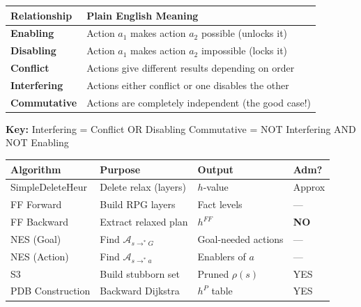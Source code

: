 \documentclass[11pt,a4paper]{article}
\begin{document}
\begin{warningbox}
\begin{center}
\begin{tabular}{@{}lp{10cm}@{}}
\toprule
\textbf{Relationship} & \textbf{Plain English Meaning} \\
\midrule
\textbf{Enabling} & Action $a_1$ makes action $a_2$ possible (unlocks it) \\
\textbf{Disabling} & Action $a_1$ makes action $a_2$ impossible (locks it) \\
\textbf{Conflict} & Actions give different results depending on order \\
\textbf{Interfering} & Actions either conflict or one disables the other \\
\textbf{Commutative} & Actions are completely independent (the good case!) \\
\bottomrule
\end{tabular}
\end{center}

\textbf{Key:} Interfering = Conflict OR Disabling \quad Commutative = NOT Interfering AND NOT Enabling
\end{warningbox}

\begin{examplebox}
\begin{center}
\begin{tabular}{@{}llll@{}}
\toprule
\textbf{Algorithm} & \textbf{Purpose} & \textbf{Output} & \textbf{Adm?} \\
\midrule
SimpleDeleteHeur & Delete relax (layers) & $h$-value & Approx \\
FF Forward & Build RPG layers & Fact levels & --- \\
FF Backward & Extract relaxed plan & $h^{FF}$ & \textbf{NO} \\
NES (Goal) & Find $\mathcal{A}_{s \to^* G}$ & Goal-needed actions & --- \\
NES (Action) & Find $\mathcal{A}_{s \to^* a}$ & Enablers of $a$ & --- \\
S3 & Build stubborn set & Pruned $\rho(s)$ & YES \\
PDB Construction & Backward Dijkstra & $h^P$ table & YES \\
\bottomrule
\end{tabular}
\end{center}
\end{examplebox}
\end{document}
